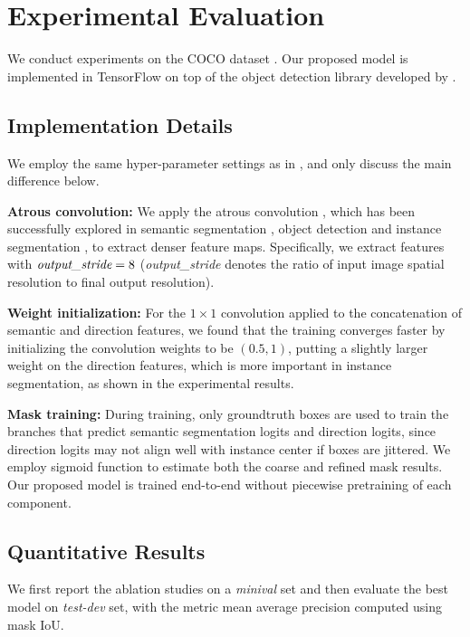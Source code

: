 \section{Experimental Evaluation}
We conduct experiments on the COCO dataset \cite{lin2014microsoft}. Our proposed model is implemented in TensorFlow \cite{abadi2016tensorflow} on top of the object detection library developed by \cite{huang2016speed}.

\subsection{Implementation Details}
We employ the same hyper-parameter settings as in \cite{huang2016speed, sun2017revisiting}, and only discuss the main difference below.

\textbf{Atrous convolution:} We apply the atrous convolution \cite{holschneider1989real, giusti2013fast, sermanet2013overfeat, papandreou2014untangling}, which has been successfully explored in semantic segmentation \cite{chen2015attention, zhao2017pyramid, chen2017rethinking}, object detection \cite{dai2016rfcn, huang2016speed} and instance segmentation \cite{zhang2015monocular, dai2017fully}, to extract denser feature maps. Specifically, we extract features with $\emph{output\_stride}=8$ (\emph{output\_stride} denotes the ratio of input image spatial resolution to final output resolution).

\textbf{Weight initialization:} For the $1\times1$ convolution applied to the concatenation of semantic and direction features, we found that the training converges faster by initializing the convolution weights to be $(0.5, 1)$, putting a slightly larger weight on the direction features, which is more important in instance segmentation, as shown in the experimental results.

\textbf{Mask training:} During training, only groundtruth boxes are used to train the branches that predict semantic segmentation logits and direction logits, since direction logits may not align well with instance center if boxes are jittered. We employ sigmoid function to estimate both the coarse and refined mask results. Our proposed model is trained end-to-end without piecewise pretraining of each component.

\subsection{Quantitative Results}
We first report the ablation studies on a \textit{minival} set and then evaluate the best model on \textit{test-dev} set, with the metric mean average precision computed using mask IoU.

